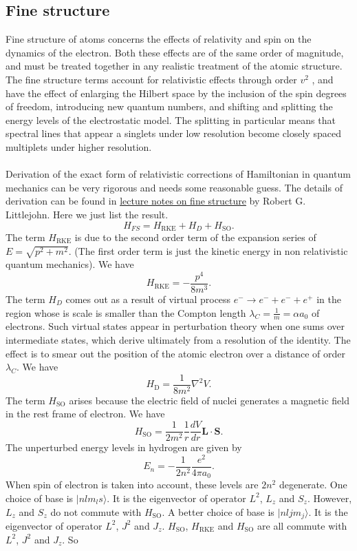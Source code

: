 \subsection{Fine structure}
Fine structure of atoms concerns the effects of relativity and spin on the dynamics of the electron. Both these effects are of the same order of magnitude, and must be treated together in any realistic treatment of the atomic structure.
The fine structure terms account for relativistic effects through order $v^2$ , and have the effect of enlarging the Hilbert space by the inclusion of the spin degrees of freedom, introducing new quantum numbers, and shifting and splitting the energy levels of the electrostatic model. 
The splitting in particular means that spectral lines that appear a singlets under low resolution become closely spaced multiplets under higher resolution.
\\ \\
Derivation of the exact form of relativistic corrections of Hamiltonian in quantum mechanics can be very rigorous and needs some reasonable guess. The details of derivation can be found in 
\href{http://bohr.physics.berkeley.edu/classes/221/1112/notes/finestruc.pdf}{lecture notes on fine structure} by Robert G. Littlejohn. Here we just list the result.
\[H_{FS} = H_{\mathrm{RKE}} + H_{D} + H_{\mathrm{SO}}.\]
The term $H_{\mathrm{RKE}}$ is due to the second order term of the expansion series of $E = \sqrt{p^2+m^2}$. (The first order term is just the kinetic energy in non relativistic quantum mechanics). We have
\[H_{\mathrm{RKE}} = - \frac{p^4}{8m^3}.\]
The term $H_{D}$ comes out as a result of virtual process $e^{-} \to e^{-} + e^{-} + e^{+}$ in the region whose is scale is smaller than the Compton length $\lambda_C = \frac{1}{m} = \alpha a_0$ of electrons. Such virtual states appear in perturbation theory when one sums over intermediate states, which derive ultimately from a resolution of the identity. The effect is to smear out the position of the atomic electron
over a distance of order $\lambda_C$. We have
\[H_{\mathrm{D}} = \frac{1}{8m^2} \nabla^2 V.\]
The term $H_{\mathrm{SO}}$ arises because the electric field of nuclei generates a magnetic field in the rest frame of electron. We have
\[H_{\mathrm{SO}} = \frac{1}{2m^2} \frac{1}{r} \frac{dV}{dr} \bm{L}\cdot\bm{S}.\]
The unperturbed energy levels in hydrogen are given by
\[E_n = -\frac{1}{2n^2} \frac{e^2}{4\pi a_0}.\]
When spin of electron is taken into account,  these levels are $2n^2$ degenerate. One choice of base is $|nlm_{l}s\rangle$. It is the eigenvector of operator $L^2$, $L_z$ and $S_z$. However, $L_z$ and $S_z$ do not commute with $H_{\mathrm{SO}}$. A better choice of base is $|nljm_j\rangle$. It is the eigenvector of operator $L^2$, $J^2$ and $J_z$. $H_{\mathrm{SO}}$, $H_{\mathrm{RKE}}$ and $H_{\mathrm{SO}}$ are all commute with $L^2$, $J^2$ and $J_z$. So
